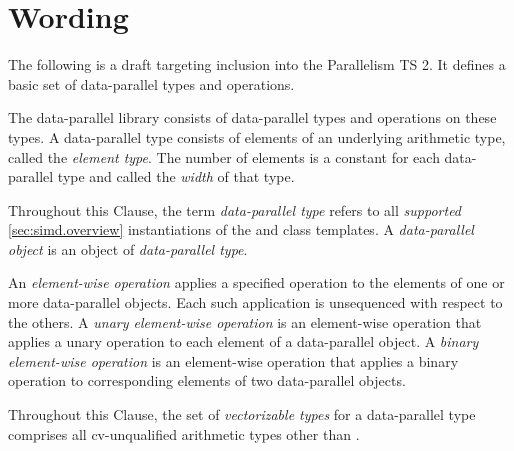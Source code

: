 \section{Wording}

The following is a draft targeting inclusion into the Parallelism TS 2.
It defines a basic set of data-parallel types and operations.

\newcommand\clause{Clause\xspace}
\newcommand\width{width\xspace}

\begin{wgText}
  \setcounter{WGClause}{7}
  \pnum
  The data-parallel library consists of data-parallel types and operations on these types.
  A data-parallel type consists of elements of an underlying arithmetic type, called the \emph{element type}.
  The number of elements is a constant for each data-parallel type and called the \emph{\width} of that type.

  \pnum
  Throughout this \clause, the term \emph{data-parallel type} refers to all \emph{supported} \ref{sec:simd.overview} instantiations of the \simd and \mask class templates.
  A \emph{data-parallel object} is an object of \emph{data-parallel type}.

  \pnum
  An \emph{element-wise operation} applies a specified operation to the elements of one or more data-parallel objects.
  Each such application is unsequenced with respect to the others.
  A \emph{unary element-wise operation} is an element-wise operation that applies a unary operation to each element of a data-parallel object.
  A \emph{binary element-wise operation} is an element-wise operation that applies a binary operation to corresponding elements of two data-parallel objects.

  \pnum Throughout this \clause, the set of \emph{vectorizable types} for a data-parallel type comprises all cv-unqualified arithmetic types other than \bool.

  \pnum \label{cl:intent-note}

  
  
  
\end{wgText}

